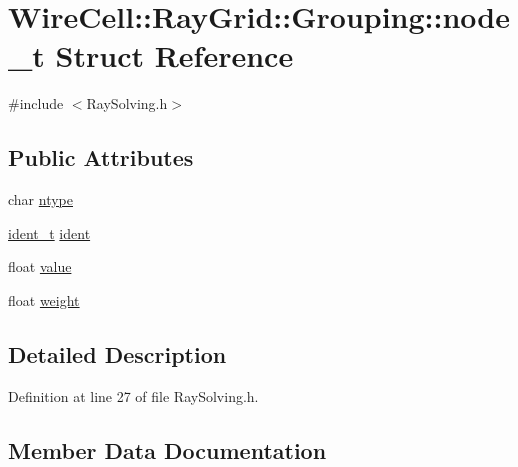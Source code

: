 \hypertarget{struct_wire_cell_1_1_ray_grid_1_1_grouping_1_1node__t}{}\section{Wire\+Cell\+:\+:Ray\+Grid\+:\+:Grouping\+:\+:node\+\_\+t Struct Reference}
\label{struct_wire_cell_1_1_ray_grid_1_1_grouping_1_1node__t}


{\ttfamily \#include $<$Ray\+Solving.\+h$>$}

\subsection*{Public Attributes}
\begin{DoxyCompactItemize}
\item 
char \hyperlink{struct_wire_cell_1_1_ray_grid_1_1_grouping_1_1node__t_a9121ea7a1f45973cbe7f36ac2d2e2000}{ntype}
\item 
\hyperlink{class_wire_cell_1_1_ray_grid_1_1_grouping_aa7b318b7f8e9a48aa15d037bd046a09b}{ident\+\_\+t} \hyperlink{struct_wire_cell_1_1_ray_grid_1_1_grouping_1_1node__t_afc1ec4fffa3c4397b1b408492fcac7f2}{ident}
\item 
float \hyperlink{struct_wire_cell_1_1_ray_grid_1_1_grouping_1_1node__t_a25cc901deb1357692fc548b1f360e4c1}{value}
\item 
float \hyperlink{struct_wire_cell_1_1_ray_grid_1_1_grouping_1_1node__t_a8fe957d122cdcbc872225b5a91768be6}{weight}
\end{DoxyCompactItemize}


\subsection{Detailed Description}


Definition at line 27 of file Ray\+Solving.\+h.



\subsection{Member Data Documentation}
\mbox{\label{struct_wire_cell_1_1_ray_grid_1_1_grouping_1_1node__t_afc1ec4fffa3c4397b1b408492fcac7f2}} 
